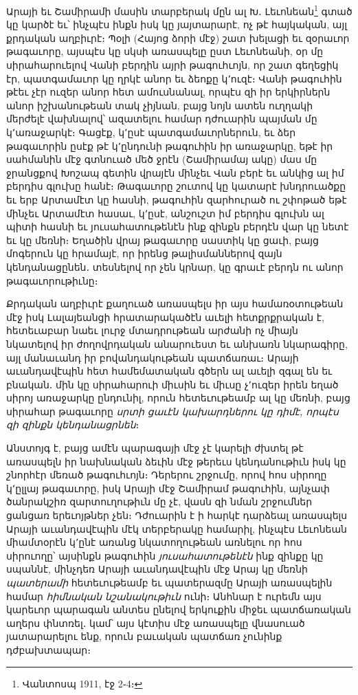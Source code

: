 \documentclass{article}
\begin{document}
{Արայի եւ Շամիրամի մասին տարբերակ մըն ալ Խ․ Լեւոնեան\footnote{Վանտոսպ 1911, էջ 2֊4։} գտած կը կարծէ եւ՝ ինչպէս ինքն իսկ կը յայտարարէ, ոչ թէ հայկական, այլ քրդական աղբիւրէ։ Պօլի (Հայոց ձորի մէջ) շատ խելացի եւ զօրաւոր թագաւորը, այսպէս կը սկսի առասպելը ըստ Լեւոնեանի, օր մը սիրահարուելով Վանի բերդին այրի թագուհւոյն, որ շատ գեղեցիկ էր, պատգամաւոր կը ղրկէ անոր եւ ձեոքը կ՚ուզէ։ Վանի թագուհին թէեւ չէր ուզեր անոր հետ ամուսնանալ, որպէս զի իր երկիրներն անոր իշխանութեան տակ չիյնան, բայց նոյն ատեն ուղղակի մերժելէ վախնալով՝ ազատելու համար դժուարին պայման մը կ՚առաջարկէ։ Գացէք, կ՚ըսէ պատգամաւորներուն, եւ ձեր թագաւորին ըսէք թէ կ՚ընդունի թագուհին իր առաջարկը, եթէ իր սահմանին մէջ գտնուած մեծ ջրէն (Շամիրամայ ակը) մաս մը ջրանցքով Խոշապ գետին վրայէն մինչեւ Վան բերէ եւ անկից ալ իմ բերդիս գլուխը հանէ։ Թագաւորը շուտով կը կատարէ խնդրուածքը եւ երբ Արտամէտ կը հասնի, թագուհին զարհուրած ու շփոթած եթէ մինչեւ Արտամէտ հասաւ, կ՚ըսէ, անշուշտ իմ բերդիս գլուխն ալ պիտի հասնի եւ յուսահատութենէն ինք զինքն բերդէն վար կը նետէ եւ կը մեռնի։ Եղածին վրայ թագաւորը սաստիկ կը ցաւի, բայց մոգերուն կը հրամայէ, որ իրենց թալիսմաններով զայն կենդանացընեն․ տեսնելով որ չեն կրնար, կը գրաւէ բերդն ու անոր թագաւորութիւնը։

Քրդական աղբիւրէ քաղուած առասպելս իր այս համառօտութեան մէջ իսկ Լալայեանցի հրատարակածէն աւելի հետքրքրական է, հետեւաբար նաեւ լուրջ մտադրութեան արժանի ոչ միայն նկատելով իր ժողովրդական անարուեստ եւ անխառն նկարագիրը, այլ մանաւանդ իր բովանդակութեան պատճառաւ։ Արայի աւանդավէպին հետ համեմատական գծերն ալ աւելի զգալ են եւ բնական․ մին կը սիրահարուի միւսին եւ միւսը չ՚ուզեր իրեն եղած սիրոյ առաջարկը ընդունիլ, որուն հետեւութեամբ ալ կը մեռնի, բայց սիրահար թագաւորը \emph{սրտի ցաւէն կախարդներու կը դիմէ, որպէս զի զինքն կենդանացրնեն}։

Անստոյգ է, բայց ամէն պարագայի մէջ չէ կարելի ժխտել թէ առասպելն իր նախնական ձեւին մէջ թերեւս կենդանութիւն իսկ կը շնորհէր մեռած թագուհւոյն։ Դերերու շրջումը, որով հոս սիրողը կ՚ըլլայ թագաւորը, իսկ Արայի մէջ Շամիրամ թագուհին, այնչափ ծանրակշիռ զարտուղութիւն մը չէ, վասն զի նման շրջումներ ցանցառ երեւոյթներ չեն։ Դժուարին է ի հարկէ դարձեալ առասպելս Արայի աւանդավէպին մէկ տերբերակը համարիլ, ինչպէս Լեւոնեան միամտօրէն կ՚ընէ առանց նկատողութեան առնելու որ հոս սիրուողը՝ այսինքն թագուհին \emph{յուսահատութենէն} ինք զինքը կը սպաննէ, մինչդեռ Արայի աւանդավէպին մէջ Արայ կը մեռնի \emph{պատերամի} հետեւութեամբ եւ պատերազմը Արայի առասպելին համար \emph{հիմնական նշանակութիւն} ունի։ Անհնար է ուրեմն այս կարեւոր պարագան անտես ընելով երկուքին միջեւ պատճառական աղերս փնտռել․ կամ՝ այս կէտիս մէջ առասպելը վնասուած յատարարելու ենք, որուն բաւական պատճառ չունինք դժբախտապար։

}
\end{document}
